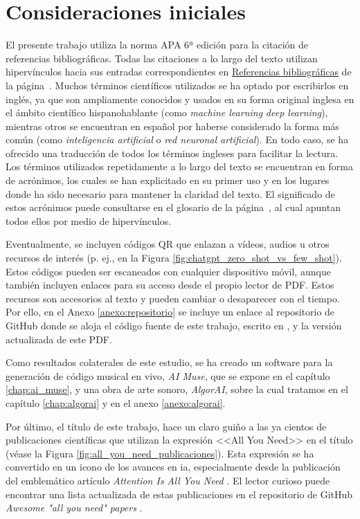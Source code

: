 \section{Consideraciones iniciales}

El presente trabajo utiliza la norma APA 6ª edición para la citación de referencias bibliográficas. Todas las citaciones a lo largo del texto utilizan hipervínculos hacia sus entradas correspondientes en \hyperref[chap:referencias]{Referencias bibliográficas} de la página~\pageref{chap:referencias}. Muchos términos científicos utilizados se ha optado por escribirlos en inglés, ya que son ampliamente conocidos y usados en su forma original inglesa en el ámbito científico hispanohablante (como \emph{machine learning} \emph{deep learning}), mientras otros se encuentran en español por haberse considerado la forma más común (como \emph{inteligencia artificial} o \emph{red neuronal artificial}). En todo caso, se ha ofrecido una traducción de todos los términos ingleses para facilitar la lectura. Los términos utilizados repetidamente a lo largo del texto se encuentran en forma de acrónimos, los cuales se han explicitado en su primer uso y en los lugares donde ha sido necesario para mantener la claridad del texto. El significado de estos acrónimos puede consultarse en el glosario de la página~\pageref{chap:glosario}, al cual apuntan todos ellos por medio de hipervínculos.

Eventualmente, se incluyen códigos QR que enlazan a vídeos, audios u otros recursos de interés (p. ej., en la Figura \ref{fig:chatgpt_zero_shot_vs_few_shot}). Estos códigos pueden ser escaneados con cualquier dispositivo móvil, aunque también incluyen enlaces para su acceso desde el propio lector de PDF. Estos recursos son accesorios al texto y pueden cambiar o desaparecer con el tiempo. Por ello, en el Anexo \ref{anexo:repositorio} se incluye un enlace al repositorio de GitHub donde se aloja el código fuente de este trabajo, escrito en , y la versión actualizada de este PDF.

Como resultados colaterales de este estudio, se ha creado un software para la generación de código musical en vivo, \emph{AI Muse}, que se expone en el capítulo \ref{chap:ai_muse}, y una obra de arte sonoro, \emph{AlgorAI}, sobre la cual tratamos en el capítulo \ref{chap:algorai} y en el anexo \ref{anexo:algorai}.

Por último, el título de este trabajo, hace un claro guiño a las ya cientos de publicaciones científicas que utilizan la expresión <<All You Need>> en el título (véase la Figura \ref{fig:all_you_need_publicaciones}). Esta expresión se ha convertido en un icono de los avances en \gls{ia}, especialmente desde la publicación del emblemático artículo \emph{Attention Is All You Need} \citep{vaswaniAttentionAllYou2017}. El lector curioso puede encontrar una lista actualizada de estas publicaciones en el repositorio de GitHub \emph{Awesome "all you need" papers} \citep{nishiKentoNishiAwesomeallyouneedpapers2024}.



